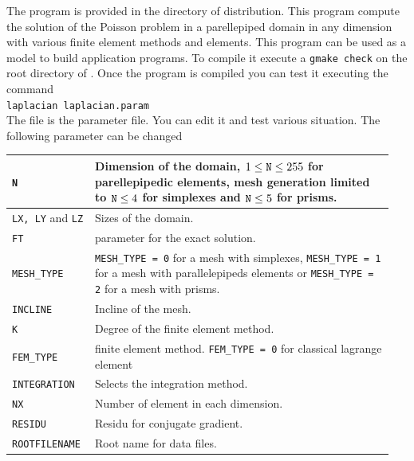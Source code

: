 \documentclass[11pt,a4paper]{article}
\begin{document}
The program  is provided in the directory  of \gf  distribution. This program compute the solution of the Poisson problem in a parellepiped domain in any dimension with various finite element methods and elements. This program can be used as a model to build application programs. To compile it execute a {\tt gmake check} on the root directory of \gf . Once the program is compiled you can test it executing the command\\[0.5cm]
{\tt laplacian laplacian.param}\\[0.5cm]
The file  is the parameter file. You can edit it and test various situation. The following parameter can be changed\\[0.5cm]
\begin{center} \begin{tabular}{|m{0.2\linewidth}|m{0.75\linewidth}|} \hline

  {\tt N} & Dimension of the domain, $1 \leq {\tt N} \leq 255$ for parellepipedic elements, mesh generation limited to ${\tt N} \leq 4$ for simplexes and ${\tt N} \leq 5$ for prisms.  \\ \hline

  {\tt LX, LY} and {\tt LZ} &  Sizes of the domain. \\ \hline

  {\tt FT} &  parameter for the exact solution. \\ \hline

  {\tt MESH\_TYPE} &  {\tt MESH\_TYPE = 0} for a mesh with simplexes,   {\tt MESH\_TYPE = 1} for a mesh with parallelepipeds elements or {\tt MESH\_TYPE = 2} for a mesh with prisms. \\ \hline

  {\tt INCLINE} &  Incline of the mesh.\\ \hline

  {\tt K} &  Degree of the finite element method. \\ \hline

  {\tt FEM\_TYPE} &  finite element method.  {\tt FEM\_TYPE = 0} for classical lagrange element\\ \hline

  {\tt INTEGRATION} & Selects the integration method.  \\ \hline

  {\tt NX} &  Number of element in each dimension. \\ \hline

  {\tt RESIDU} & Residu for conjugate gradient. \\ \hline

  {\tt ROOTFILENAME} & Root name for data files. \\ \hline

\end{tabular} \end{center}
\end{document}

